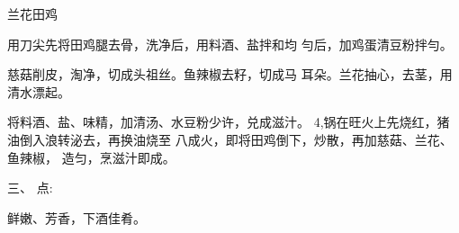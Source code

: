\begin{recipe}{兰花田鸡}

\ingredients




\cooking

\step 	用刀尖先将田鸡腿去骨，洗净后，用料酒、盐拌和均 勻后，加鸡蛋清豆粉拌勻。

\step 	慈菇削皮，淘净，切成头祖丝。鱼辣椒去籽，切成马 耳朵。兰花抽心，去茎，用清水漂起。

将料酒、盐、味精，加清汤、水豆粉少许，兑成滋汁。 4,锅在旺火上先烧红，猪油倒入浪转泌去，再换油烧至 八成火，即将田鸡倒下，炒散，再加慈菇、兰花、鱼辣椒， 造匀，烹滋汁即成。

三、 	点:

鲜嫩、芳香，下酒佳肴。

\end{recipe}

